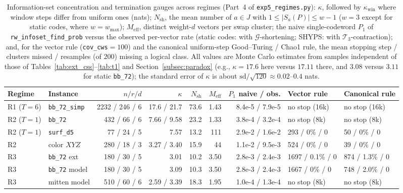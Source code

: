 \documentclass[12pt]{article}
\theoremstyle{definition}
\newcommand{\Tc}{\mathcal{T}_3}
\newcommand{\Gc}{\mathcal{G}}
\newcommand{\ttt}[1]{\texttt{#1}}
\begin{document}
\begin{table}[htbp]
\centering
\caption{Information-set concentration and termination gauges across regimes (Part~4 of \ttt{exp5\_regimes.py}):
$\kappa$, followed by $\kappa_{\mathrm{win}}$ where window steps differ from uniform ones (nats); $N_{\mathrm{sh}}$, the
mean number of $a \in J$ with $1 \le |S_a(P)| \le w - 1$ ($w = 3$ except for static codes, where $w = w_{\max}$);
$M_{\mathrm{eff}}$, distinct weight-$d$ vectors per swap cluster; the naive single-codeword $P_1$ of
\ttt{rw\_infoset\_find\_prob} versus the observed per-vector rate (static codes: with $\Gc$-shortening; SHYPS: with
$\Tc$-contraction); and, for the vector rule (\ttt{cov\_cws}$= 100$) and the canonical uniform-step Good--Turing /
Chao1 rule, the mean stopping step / clusters missed / resamples (of $200$) missing a logical class. All values are
Monte Carlo estimates from samples independent of those of Tables~\ref{tab:ext_css}--\ref{tab:t1} and
Section~\ref{subsec:paradox} (e.g., $\kappa = 17.6$ here versus $17.11$ there, and $3.08$ versus $3.11$ for static
\ttt{bb\_72}); the standard error of $\kappa$ is about $\mathrm{sd}/\sqrt{120} \approx 0.02$--$0.4$
nats.}\label{tab:regime_termination}
\smallskip
\scriptsize
\setlength{\tabcolsep}{2.6pt}
\begin{tabular}{@{}llrrrrrll@{}}
\toprule
Regime & Instance & $n / r / d$ & $\kappa$ & $N_{\mathrm{sh}}$ & $M_{\mathrm{eff}}$ & $P_1$ naive / obs. & Vector rule &
  Canonical rule \\
\midrule
R1 ($T = 6$) & \ttt{bb\_72\_simp} & 2232 / 246 / 6 & 17.6 / 21.7 & 73.6 & 1.43 & 8.4e-5 / 7.9e-5 & no stop (16k) &
  no stop (16k) \\
R2 ($T = 1$) & \ttt{bb\_72} & 432 / 66 / 6 & 7.66 / 9.58 & 23.2 & 1.33 & 3.8e-4 / 3.2e-4 & no stop (8k) &
  no stop (8k) \\
R2 ($T = 1$) & \ttt{surf\_d5} & 77 / 24 / 5 & 7.57 & 13.2 & 111 & 2.9e-2 / 1.6e-2 & 293 / 0\% / 0 & 50 / 0\% / 0 \\
R2 & color $XYZ$ & 280 / 18 / 3 & 3.27 / 3.40 & 15.9 & 44 & 1.1e-2 / 9.5e-3 & 524 / 0\% / 0 & 39 / 0\% / 0 \\
R3 & \ttt{bb\_72} ext & 180 / 30 / 5 & 3.01 & 10.2 & 3.50 & 2.8e-3 / 2.4e-3 & 1697 / 0.1\% / 0 & 874 / 1.3\% / 0 \\
R3 & \ttt{bb\_72} model & 180 / 30 / 5 & 3.09 & 10.3 & 3.50 & 2.8e-3 / 2.4e-3 & 1667 / 0\% / 0 & 748 / 2.0\% / 0 \\
R3 & mitten model & 510 / 60 / 6 & 2.59 / 3.39 & 18.3 & 1.95 & 1.0e-4 / 1.3e-4 & no stop (8k) & no stop (8k) \\

\end{tabular}
\end{table}
\end{document}

